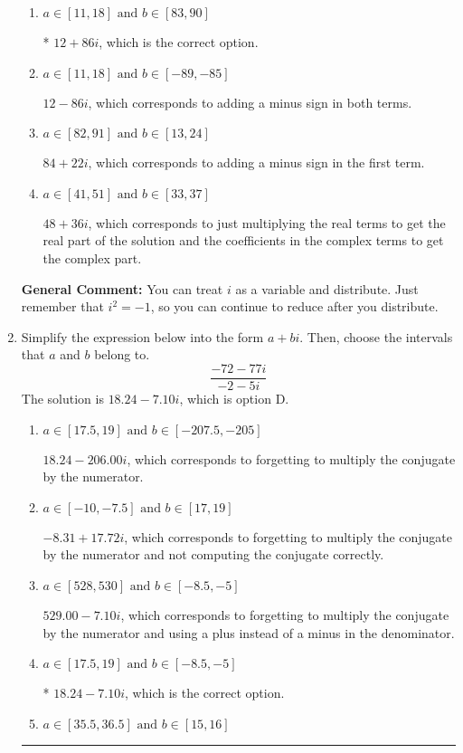 \documentclass{extbook}[14pt]
\newcommand{\litem}[1]{\item #1

\rule{\textwidth}{0.4pt}}
\begin{document}
\begin{enumerate}
{\begin{enumerate}[label=\Alph*.]
 $84 - 22 i$, which corresponds to adding a minus sign in the second term.
\item \( a \in [11, 18] \text{ and } b \in [83, 90] \)

* $12 + 86 i$, which is the correct option.
\item \( a \in [11, 18] \text{ and } b \in [-89, -85] \)

 $12 - 86 i$, which corresponds to adding a minus sign in both terms.
\item \( a \in [82, 91] \text{ and } b \in [13, 24] \)

 $84 + 22 i$, which corresponds to adding a minus sign in the first term.
\item \( a \in [41, 51] \text{ and } b \in [33, 37] \)

 $48 + 36 i$, which corresponds to just multiplying the real terms to get the real part of the solution and the coefficients in the complex terms to get the complex part.
\end{enumerate}

\textbf{General Comment:} You can treat $i$ as a variable and distribute. Just remember that $i^2=-1$, so you can continue to reduce after you distribute.
}
\litem{
Simplify the expression below into the form $a+bi$. Then, choose the intervals that $a$ and $b$ belong to.
\[ \frac{-72 - 77 i}{-2 - 5 i} \]The solution is \( 18.24  - 7.10 i \), which is option D.\begin{enumerate}[label=\Alph*.]
\item \( a \in [17.5, 19] \text{ and } b \in [-207.5, -205] \)

 $18.24  - 206.00 i$, which corresponds to forgetting to multiply the conjugate by the numerator.
\item \( a \in [-10, -7.5] \text{ and } b \in [17, 19] \)

 $-8.31  + 17.72 i$, which corresponds to forgetting to multiply the conjugate by the numerator and not computing the conjugate correctly.
\item \( a \in [528, 530] \text{ and } b \in [-8.5, -5] \)

 $529.00  - 7.10 i$, which corresponds to forgetting to multiply the conjugate by the numerator and using a plus instead of a minus in the denominator.
\item \( a \in [17.5, 19] \text{ and } b \in [-8.5, -5] \)

* $18.24  - 7.10 i$, which is the correct option.
\item \( a \in [35.5, 36.5] \text{ and } b \in [15, 16] \)


\end{enumerate}}
\end{enumerate}
\end{document}
